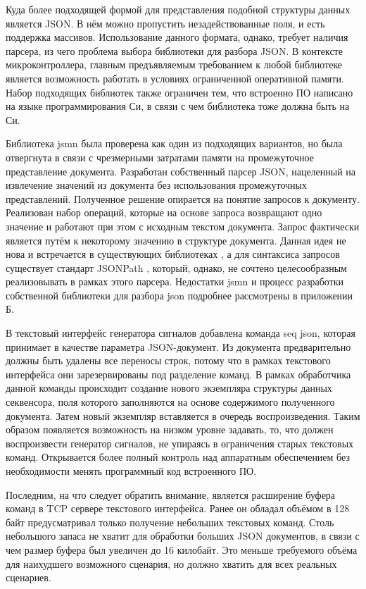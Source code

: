 \documentclass{report}
\begin{document}
Куда более подходящей формой для представления подобной структуры данных является JSON. В нём можно пропустить незадействованные поля, и есть поддержка массивов. Использование данного формата, однако, требует наличия парсера, из чего проблема выбора библиотеки для разбора JSON. В контексте микроконтроллера, главным предъявляемым требованием к любой библиотеке является возможность работать в условиях ограниченной оперативной памяти. Набор подходящих библиотек также ограничен тем, что встроенно ПО написано на языке программирования Си, в связи с чем библиотека тоже должна быть на Си.

Библиотека jsmn \cite{jsmn} была проверена как один из подходящих вариантов, но была отвергнута в связи с чрезмерными затратами памяти на промежуточное представление документа. Разработан собственный парсер JSON, нацеленный на извлечение значений из документа без использования промежуточных представлений. Полученное решение опирается на понятие запросов к документу. Реализован набор операций, которые на основе запроса возвращают одно значение и работают при этом с исходным текстом документа. Запрос фактически является путём к некоторому значению в структуре документа. Данная идея не нова и встречается в существующих библиотеках \cite{jread}, а для синтаксиса запросов существует стандарт JSONPath \cite{jsonpath}, который, однако, не сочтено целесообразным реализовывать в рамках этого парсера. Недостатки jsmn и процесс разработки собственной библиотеки для разбора json подробнее рассмотрены в приложении Б.

В текстовый интерфейс генератора сигналов добавлена команда seq json, которая принимает в качестве параметра JSON-документ. Из документа предварительно должны быть удалены все переносы строк, потому что в рамках текстового интерфейса они зарезервированы под разделение команд. В рамках обработчика данной команды происходит создание нового экземпляра структуры данных секвенсора, поля которого заполняются на основе содержимого полученного документа. Затем новый экземпляр вставляется в очередь воспроизведения. Таким образом появляется возможность на низком уровне задавать, то, что должен воспроизвести генератор сигналов, не упираясь в ограничения старых текстовых команд. Открывается более полный контроль над аппаратным обеспечением без необходимости менять программный код встроенного ПО.

Последним, на что следует обратить внимание, является расширение буфера команд в TCP сервере текстового интерфейса. Ранее он обладал объёмом в 128 байт предусматривал только получение небольших текстовых команд. Столь небольшого запаса не хватит для обработки больших JSON документов, в связи с чем размер буфера был увеличен до 16 килобайт. Это меньше требуемого объёма для наихудшего возможного сценария, но должно хватить для всех реальных сценариев.
\end{document}
